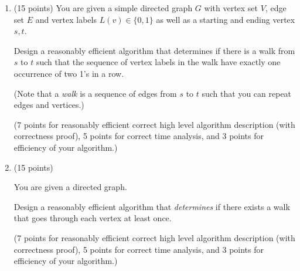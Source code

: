 \documentclass[10pt,letterpaper,unboxed,cm]{article}
\begin{document}
\begin{enumerate}
\begin{enumerate}
\end{enumerate}

\item (15 points)
You are given a simple directed graph $G$ with vertex set $V$, edge set $E$ and vertex labels $L(v)\in  \{0,1\}$ as well as a starting and ending vertex $s,t$.

Design a reasonably efficient algorithm that determines if there is a walk from $s$ to $t$ such that the sequence of vertex labels in the walk have exactly one occurrence of two 1's in a row.

(Note that a \emph{walk} is a sequence of edges from $s$ to $t$ such that you can repeat edges and vertices.)

(7 points for reasonably efficient correct high level algorithm description (with correctness proof), 5 points for correct time analysis,
and 3 points for efficiency of your algorithm.)

\item (15 points)

You are given a directed graph.

Design a reasonably efficient algorithm that
\emph{determines} if there exists a walk that goes through each vertex at least once.

(7 points for reasonably efficient correct high level algorithm description (with correctness proof), 5 points for correct time analysis,
and 3 points for efficiency of your algorithm.)
\end{enumerate}
\end{document}
